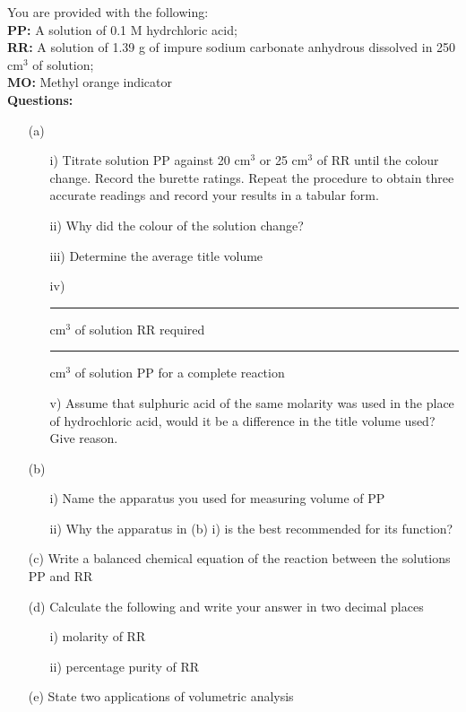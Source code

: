 \noindent You are provided with the following:\\
\noindent \textbf{PP:} A solution of 0.1 M hydrchloric acid; \\
\noindent \textbf{RR:} A solution of 1.39 g of impure sodium carbonate anhydrous dissolved in 250 cm$^3$ of solution; \\
\noindent \textbf{MO:} Methyl orange indicator \\

\noindent \textbf{Questions:} 
\begin{enumerate}[topsep=0ex,itemsep=0ex,partopsep=1ex,parsep=1ex]
	\item[(a)] 
	\begin{enumerate}[topsep=0ex,itemsep=0ex,partopsep=1ex,parsep=1ex]
		\item[i)] Titrate solution PP against 20 cm$^3$ or 25 cm$^3$ of RR until the colour change. Record the burette ratings. Repeat the procedure to obtain three accurate readings and record your results in a tabular form.
		\item[ii)] Why did the colour of the solution change?
		\item[iii)] Determine the average title volume
		\item[iv)] \rule{1.5cm}{0.15mm} cm$^3$ of solution RR required \rule{1.5cm}{0.15mm} cm$^3$ of solution PP for a complete reaction
		\item[v)] Assume that sulphuric acid of the same molarity was used in the place of hydrochloric acid, would it be a difference in the title volume used? Give reason.
	\end{enumerate}
	\item[(b)]
	\begin{enumerate}[topsep=0ex,itemsep=0ex,partopsep=1ex,parsep=1ex]
		\item[i)] Name the apparatus you used for measuring volume of PP
		\item[ii)] Why the apparatus in (b) i) is the best recommended for its function?
	\end{enumerate}
	\item[(c)] Write a balanced chemical equation of the reaction between the solutions PP and RR
	\item[(d)] Calculate the following and write your answer in two decimal places
	\begin{enumerate}[topsep=0ex,itemsep=0ex,partopsep=1ex,parsep=1ex]
		\item[i)] molarity of RR
		\item[ii)] percentage purity of RR
	\end{enumerate}
	\item[(e)] State two applications of volumetric analysis
\end{enumerate}

